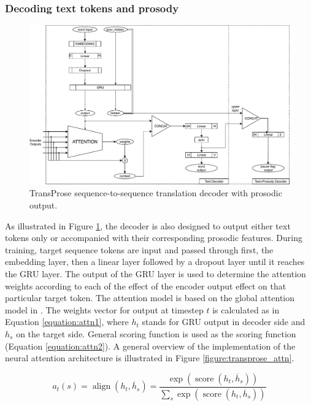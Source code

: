 \subsubsection{Decoding text tokens and prosody}

\begin{figure}
\includegraphics[width=\linewidth]{img/TransProse_Decoder.pdf}
\caption{TransProse sequence-to-sequence translation decoder with prosodic output.}
\label{figure:transprose_decoder}
\end{figure}

As illustrated in Figure \ref{figure:transprose_decoder}, the decoder is also designed to output either text tokens only or accompanied with their corresponding prosodic features. During training, target sequence tokens are input and passed through first, the embedding layer, then a linear layer followed by a dropout layer until it reaches the GRU layer. The output of the GRU layer is used to determine the attention weights according to each of the effect of the encoder output effect on that particular target token. The attention model is based on the global attention model in \cite{luong}. The weights vector for output at timestep $t$ is calculated as in Equation \ref{equation:attn1}, where $h _ { t }$ stands for GRU output in decoder side and $h _ { s }$ on the target side. General scoring function is used as the scoring function (Equation \ref{equation:attn2}). A general overview of the implementation of the neural attention architecture is illustrated in Figure \ref{figure:transprose_attn}.

\begin{equation}
\label{equation:attn1}
a _ { t } ( s ) = \operatorname { align } \left( h _ { t } , \overline { h } _ { s } \right) = \frac { \exp \left( \operatorname { score } \left( h _ { t } , \overline { h } _ { s } \right) \right) } { \sum _ { s } \exp \left( \operatorname { score } \left( h _ { t } , \overline { h } _ { s } \right) \right) }
\end{equation}
 

